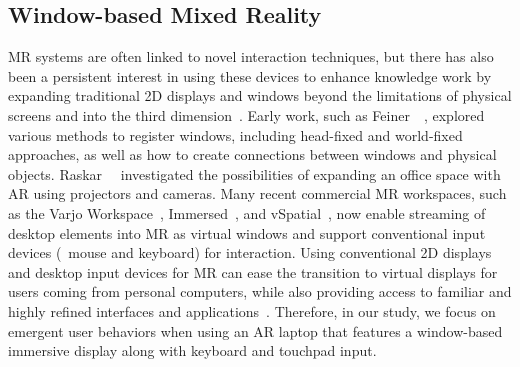 \subsection{Window-based Mixed Reality}
MR systems are often linked to novel interaction techniques, but there has also been a persistent interest in using these devices to enhance knowledge work by expanding traditional 2D displays and windows beyond the limitations of physical screens and into the third dimension~\cite{pavanatto2024multiplemonitors}.
Early work, such as Feiner~\etal~\cite{feiner1993windows}, 
explored various methods to register windows,
including head-fixed and world-fixed approaches, 
as well as how to create connections between windows and physical objects.
Raskar~\etal~\cite{raskar1998officefuture} investigated the possibilities of expanding an office space with AR using projectors and cameras.
Many recent commercial MR workspaces, such as the Varjo Workspace~\cite{varjoworkspace}, 
Immersed~\cite{immersed},
and vSpatial~\cite{vspatial},
now enable streaming of desktop elements into MR as virtual windows and support conventional input devices (\ie~mouse and keyboard) for interaction.
Using conventional 2D displays and desktop input devices for MR can ease the transition to virtual displays for users coming from personal computers, while also providing access to familiar and highly refined interfaces and applications~\cite{pavanatto2024multiplemonitors}.
Therefore, in our study, we focus on emergent user behaviors when using an AR laptop that features a window-based immersive display along with keyboard and touchpad input.

